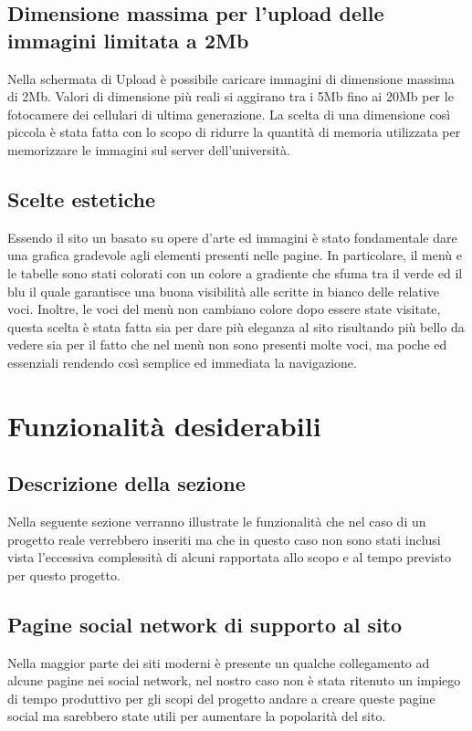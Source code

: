 \documentclass[openany, a4paper, 12pt]{report}
\begin{document}
		\section{Dimensione massima per l'upload delle immagini limitata a 2Mb}
				Nella schermata di Upload è possibile caricare immagini di dimensione massima di 2Mb. Valori di dimensione più reali si aggirano tra i 5Mb fino ai 20Mb per le fotocamere dei cellulari di ultima generazione. La scelta di una dimensione così piccola è stata fatta con lo scopo di ridurre la quantità di memoria utilizzata per memorizzare le immagini sul server dell'università.\\
		\section{Scelte estetiche}
				Essendo il sito un basato su opere d'arte ed immagini è stato fondamentale dare una grafica gradevole agli elementi presenti nelle pagine. In particolare, il menù e le tabelle sono stati colorati con un colore a gradiente che sfuma tra il verde ed il blu il quale garantisce una buona visibilità alle scritte in bianco delle relative voci. Inoltre, le voci del menù non cambiano colore dopo essere state visitate, questa scelta è stata fatta sia per dare più eleganza al sito risultando più bello da vedere sia per il fatto che nel menù non sono presenti molte voci, ma poche ed essenziali rendendo così semplice ed immediata la navigazione.
			
	\chapter{Funzionalit\`{a} desiderabili}
		\section{Descrizione della sezione}
		Nella seguente sezione verranno illustrate le funzionalità che nel caso di un progetto reale verrebbero inseriti ma che in questo caso non sono stati inclusi vista l'eccessiva complessità di alcuni rapportata allo scopo e al tempo previsto per questo progetto.

		\section{Pagine social network di supporto al sito}
		Nella maggior parte dei siti moderni è presente un qualche collegamento ad alcune pagine nei social network, nel nostro caso non è stata ritenuto un impiego di tempo produttivo per gli scopi del progetto andare a creare queste pagine social ma sarebbero state utili per aumentare la popolarità del sito.
\end{document}

